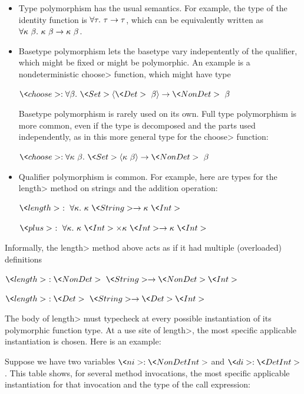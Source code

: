 \begin{itemize}
\item
Type polymorphism has the usual semantics.  For example, the type of the
identity function is $\forall \tau . \  \tau \rightarrow \tau$, which can be
equivalently written as
$\forall \kappa \ \beta . \  \kappa \ \beta \rightarrow \kappa \ \beta$.


\item
  Basetype polymorphism lets the basetype vary indepentently of the
  qualifier, which might be fixed or might be polymorphic.
  An example is a nondeterministic \<choose> function, which might have type

  $\<choose> : \forallt{\beta} \<Set>\angles{\<Det>\ \beta} \rightarrow \<NonDet>\ \beta$

  Basetype polymorphism is rarely used on its own.  Full type polymorphism is more
  common, even if the type is decomposed and the parts used independently,
  as in this more general type for the \<choose> function:

  $\<choose> : \forallt{\kappa\ \beta} \<Set>\angles{\kappa\ \beta} \rightarrow \<NonDet>\ \beta$

\item
Qualifier polymorphism is common.  For example, here are types for
the \<length> method on strings and the addition operation:

$\<length>\ :\ \forallt{\kappa} \kappa\ \<String> \rightarrow \kappa\ \<Int>$

$\<plus>\ :\ \forallt{\kappa} \kappa\ \<Int> \times \kappa\ \<Int> \rightarrow \kappa\ \<Int>$

\end{itemize}

Informally, the \<length> method above acts as if it had multiple
(overloaded) definitions

$\<length>\ : \<NonDet>\ \<String> \rightarrow \<NonDet> \<Int>$

$\<length>\ :\<Det>\ \<String> \rightarrow \<Det> \<Int>$

The body of \<length> must typecheck at every possible instantiation of its
polymorphic function type.  At a use site of \<length>,
the most specific applicable instantiation is chosen.
Here is an example:

Suppose we have two variables $\<ni> : \<NonDet Int>$ and $\<di> : \<Det Int>$.
This table shows, for several method invocations, the 
most specific applicable instantiation for that invocation and the type of
the call expression:

